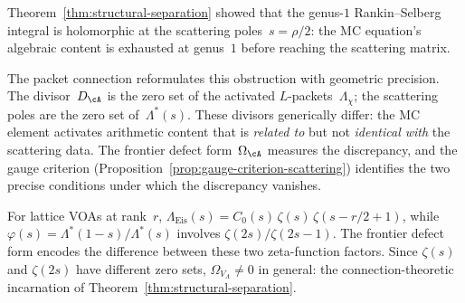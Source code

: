 \begin{remark}%
\label{rem:packet-reformulation}%
%
Theorem~\ref{thm:structural-separation} showed that the
genus-$1$ Rankin--Selberg integral is holomorphic at the
scattering poles~$s = \rho/2$: the MC equation's algebraic
content is exhausted at genus~$1$ before reaching the
scattering matrix.

The packet connection reformulates this obstruction with
geometric precision. The divisor~$D_\cA$ is the zero set
of the activated $L$-packets~$\Lambda_\chi$; the scattering
poles are the zero set of~$\Lambda^*(s)$. These divisors
generically differ: the MC element activates arithmetic
content that is \emph{related to} but not \emph{identical
with} the scattering data. The frontier defect
form~$\Omega_\cA$ measures the discrepancy, and the
gauge criterion
\textup{(}Proposition~\textup{\ref{prop:gauge-criterion-scattering}}\textup{)}
identifies the two precise conditions under which the
discrepancy vanishes.

For lattice VOAs at rank~$r$,
$\Lambda_{\mathrm{Eis}}(s) = C_0(s)\,\zeta(s)\,\zeta(s{-}r/2{+}1)$,
while $\varphi(s) = \Lambda^*(1{-}s)/\Lambda^*(s)$ involves
$\zeta(2s)/\zeta(2s{-}1)$. The frontier defect form encodes
the difference between these two zeta-function factors.
Since $\zeta(s)$ and $\zeta(2s)$ have different zero sets,
$\Omega_{V_\Lambda} \ne 0$ in general: the connection-theoretic
incarnation of Theorem~\ref{thm:structural-separation}.
\end{remark}


